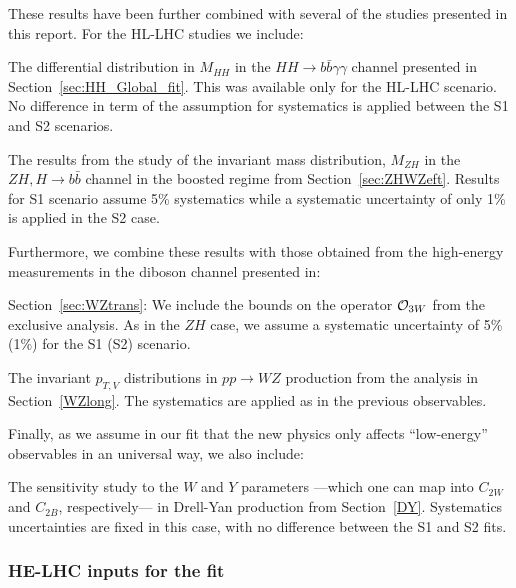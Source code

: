 These results have been further combined with several of the studies presented in this report. 
  For the HL-LHC studies we include:
  \begin{enumerate}
  {\item The differential distribution in $M_{HH}$ in the $HH\to b\bar{b}\gamma\gamma$ channel presented in Section~\ref{sec:HH_Global_fit}. This was available only for the HL-LHC scenario. No difference in term of the assumption for systematics is applied between the S1 and S2 scenarios.}
  {\item The results from the study of the invariant mass distribution, $M_{ZH}$ in the $ZH, H\to b\bar{b}$ channel in the boosted regime from Section~\ref{sec:ZHWZeft}. Results for S1 scenario assume 5\% systematics while a systematic uncertainty of only 1\% is applied in the S2 case. 
  }
  \end{enumerate}
 Furthermore, we combine these results with those obtained from the high-energy measurements in the diboson channel presented in:
 \begin{enumerate}
 \setcounter{enumi}{2}
 {\item Section~\ref{sec:WZtrans}: We include the bounds on the operator ${\cal O}_{3W}$ from the exclusive analysis. As in the $ZH$ case, we assume a systematic uncertainty of 5\% (1\%) for the S1 (S2) scenario.}
 {\item The invariant $p_{T,V}$ distributions in $pp\to WZ$ production from the analysis in Section~\ref{WZlong}. The systematics are applied as in the previous observables.}  
 \end{enumerate}
%
Finally, as we assume in our fit that the new physics only affects ``low-energy'' observables in an universal way, we also include:
%
\begin{enumerate}
\setcounter{enumi}{4}
%
{\item The sensitivity study to the $W$ and $Y$ parameters ---which one can map into $C_{2W}$ and $C_{2B}$, respectively--- in Drell-Yan
production from Section~\ref{DY}. Systematics uncertainties are fixed in this case, with no difference between the S1 and S2 fits.}
%
\end{enumerate}
%


\subsubsection*{HE-LHC inputs for the fit}

